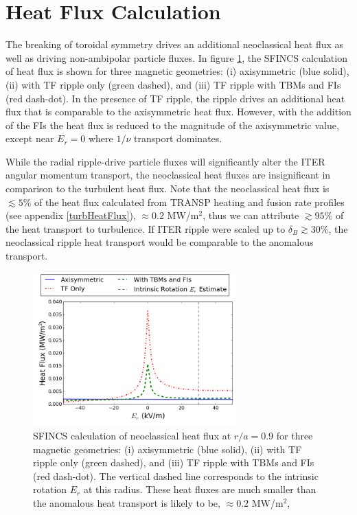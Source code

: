\documentclass{article}
\numberwithin{figure}{section}
\numberwithin{equation}{section}
\begin{document}
\FloatBarrier

\section{Heat Flux Calculation}\label{heatflux}
The breaking of toroidal symmetry drives an additional neoclassical heat flux as well as driving non-ambipolar particle fluxes. In figure \ref{fig:HeatFlux}, the SFINCS calculation of heat flux is shown for three magnetic geometries: (i) axisymmetric (blue solid), (ii) with TF ripple only (green dashed), and (iii) TF ripple with TBMs and FIs (red dash-dot). In the presence of TF ripple, the ripple drives an additional heat flux that is comparable to the axisymmetric heat flux. However, with the addition of the FIs the heat flux is reduced to the magnitude of the axisymmetric value, except near $E_r = 0$ where $1/\nu$ transport dominates. 

While the radial ripple-drive particle fluxes will significantly alter the ITER angular momentum transport, the neoclassical heat fluxes are insignificant in comparison to the turbulent heat flux. Note that the neoclassical heat flux is $\lesssim 5\%$  of the heat flux calculated from TRANSP heating and fusion rate profiles (see appendix \ref{turbHeatFlux}), $\approx 0.2$ MW/m$^2$, thus we can attribute $\gtrsim 95\%$ of the heat transport to turbulence. If ITER ripple were scaled up to $\delta_B \gtrsim 30\%$, the neoclassical ripple heat transport would be comparable to the anomalous transport.

\begin{figure}[h!]
\centering
\includegraphics[width=0.7\textwidth]
{HeatFlux.png}
\caption{\label{fig:HeatFlux} SFINCS calculation of neoclassical heat flux at $r/a = 0.9$ for three magnetic geometries: (i) axisymmetric (blue solid), (ii) with TF ripple only (green dashed), and (iii) TF ripple with TBMs and FIs (red dash-dot). The vertical dashed line corresponds to the intrinsic rotation $E_r$ at this radius. These heat fluxes are much smaller than the anomalous heat transport is likely to be, $\approx 0.2$ MW/m$^2$,}
\end{figure}
\end{document}
